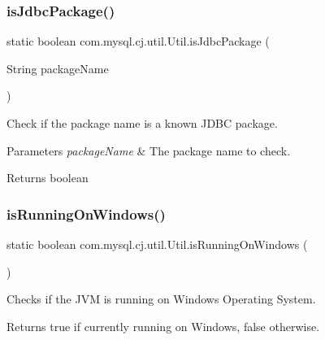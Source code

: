 \subsubsection{\texorpdfstring{is\+Jdbc\+Package()}{isJdbcPackage()}}
{\footnotesize\ttfamily static boolean com.\+mysql.\+cj.\+util.\+Util.\+is\+Jdbc\+Package (\begin{DoxyParamCaption}\item[{String}]{package\+Name }\end{DoxyParamCaption})\hspace{0.3cm}{\ttfamily [static]}}

Check if the package name is a known J\+D\+BC package.


\begin{DoxyParams}{Parameters}
{\em package\+Name} & The package name to check. \\
\hline
\end{DoxyParams}
\begin{DoxyReturn}{Returns}
boolean 
\end{DoxyReturn}
\mbox{\label{classcom_1_1mysql_1_1cj_1_1util_1_1_util_a4e59730a5516d2c70614031e108c51bb}} 
\subsubsection{\texorpdfstring{is\+Running\+On\+Windows()}{isRunningOnWindows()}}
{\footnotesize\ttfamily static boolean com.\+mysql.\+cj.\+util.\+Util.\+is\+Running\+On\+Windows (\begin{DoxyParamCaption}{ }\end{DoxyParamCaption})\hspace{0.3cm}{\ttfamily [static]}}

Checks if the J\+VM is running on Windows Operating System.

\begin{DoxyReturn}{Returns}
{\ttfamily true} if currently running on Windows, {\ttfamily false} otherwise. 
\end{DoxyReturn}
\mbox{\label{classcom_1_1mysql_1_1cj_1_1util_1_1_util_afdf93512d8a6651e10b26d2f6f5613b2}} 
